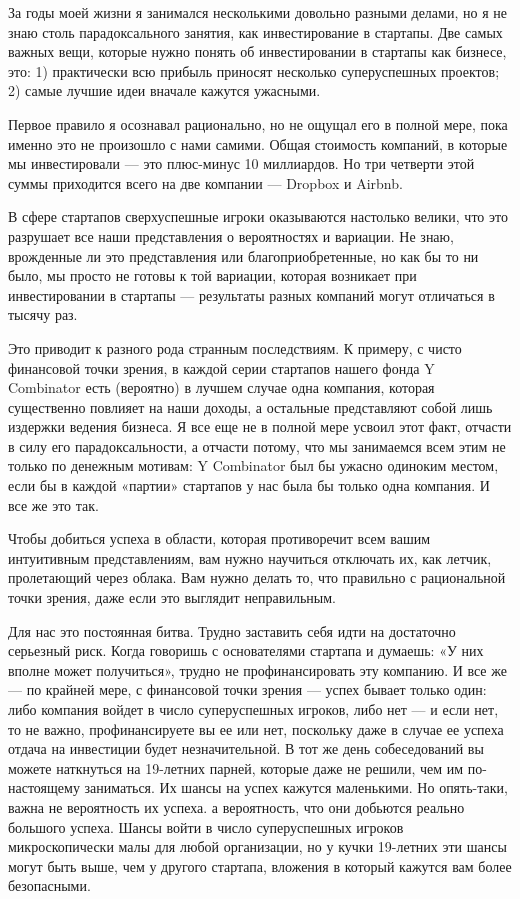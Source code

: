 \documentclass[ebook,12pt,oneside,openany]{memoir}
\begin{document}
\maketitle

За годы моей жизни я занимался несколькими довольно разными делами, но
я не знаю столь парадоксального занятия, как инвестирование в
стартапы. Две самых важных вещи, которые нужно понять об
инвестировании в стартапы как бизнесе, это: 1) практически всю прибыль
приносят несколько суперуспешных проектов; 2) самые лучшие идеи
вначале кажутся ужасными.

Первое правило я осознавал рационально, но не ощущал его в полной
мере, пока именно это не произошло с нами самими. Общая стоимость
компаний, в которые мы инвестировали — это плюс-минус 10 миллиардов.
Но три четверти этой суммы приходится всего на две компании — Dropbox
и Airbnb.

В сфере стартапов сверхуспешные игроки оказываются настолько велики,
что это разрушает все наши представления о вероятностях и вариации. Не
знаю, врожденные ли это представления или благоприобретенные, но как
бы то ни было, мы просто не готовы к той вариации, которая возникает
при инвестировании в стартапы — результаты разных компаний могут
отличаться в тысячу раз.

Это приводит к разного рода странным последствиям. К примеру, с чисто
финансовой точки зрения, в каждой серии стартапов нашего фонда Y
Combinator есть (вероятно) в лучшем случае одна компания, которая
существенно повлияет на наши доходы, а остальные представляют собой
лишь издержки ведения бизнеса. Я все еще не в полной мере усвоил этот
факт, отчасти в силу его парадоксальности, а отчасти потому, что мы
занимаемся всем этим не только по денежным мотивам: Y Combinator был
бы ужасно одиноким местом, если бы в каждой «партии» стартапов у нас
была бы только одна компания. И все же это так.

Чтобы добиться успеха в области, которая противоречит всем вашим
интуитивным представлениям, вам нужно научиться отключать их, как
летчик, пролетающий через облака. Вам нужно делать то, что правильно с
рациональной точки зрения, даже если это выглядит неправильным.

Для нас это постоянная битва. Трудно заставить себя идти на достаточно
серьезный риск. Когда говоришь с основателями стартапа и думаешь: «У
них вполне может получиться», трудно не профинансировать эту компанию.
И все же — по крайней мере, с финансовой точки зрения — успех бывает
только один: либо компания войдет в число суперуспешных игроков, либо
нет — и если нет, то не важно, профинансируете вы ее или нет,
поскольку даже в случае ее успеха отдача на инвестиции будет
незначительной. В тот же день собеседований вы можете наткнуться на
19-летних парней, которые даже не решили, чем им по-настоящему
заниматься. Их шансы на успех кажутся маленькими. Но опять-таки, важна
не вероятность их успеха. а вероятность, что они добьются реально
большого успеха. Шансы войти в число суперуспешных игроков
микроскопически малы для любой организации, но у кучки 19-летних эти
шансы могут быть выше, чем у другого стартапа, вложения в который
кажутся вам более безопасными.
\end{document}
